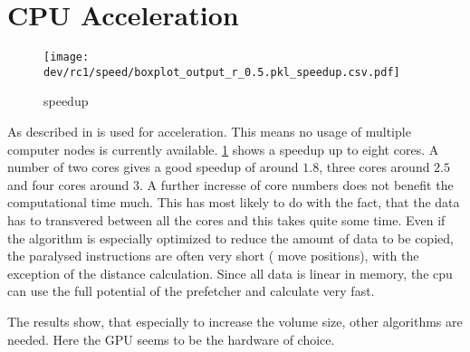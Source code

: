 \section{CPU Acceleration}
% 
\begin{figure}[!t]
\centering
\texttt{[image: dev/rc1/speed/boxplot\_output\_r\_0.5.pkl\_speedup.csv.pdf]}
\caption{speedup}
\label{fig:solverSpeedup}
\end{figure}
% 
As described in \dummy{} \openmp{} is used for acceleration.
This means no usage of multiple computer nodes is currently available.
\cref{fig:solverSpeedup} shows a speedup up to eight cores.
A number of two cores gives a good speedup of around $1.8$, three cores around $2.5$ and four cores around $3$.
A further incresse of core numbers does not benefit the computational time much.
This has most likely to do with the fact, that the data has to transvered between all the cores and this takes quite some time.
Even if the algorithm is especially optimized to reduce the amount of data to be copied, the paralysed instructions are often very short (\eg{} move positions), with the exception of the distance calculation.
Since all data is linear in memory, the cpu can use the full potential of the prefetcher and calculate very fast.
\par
% 
The results show, that especially to increase the volume size, other algorithms are needed. 
Here the \ac{GPU} seems to be the hardware of choice.
% 
% 
% 
